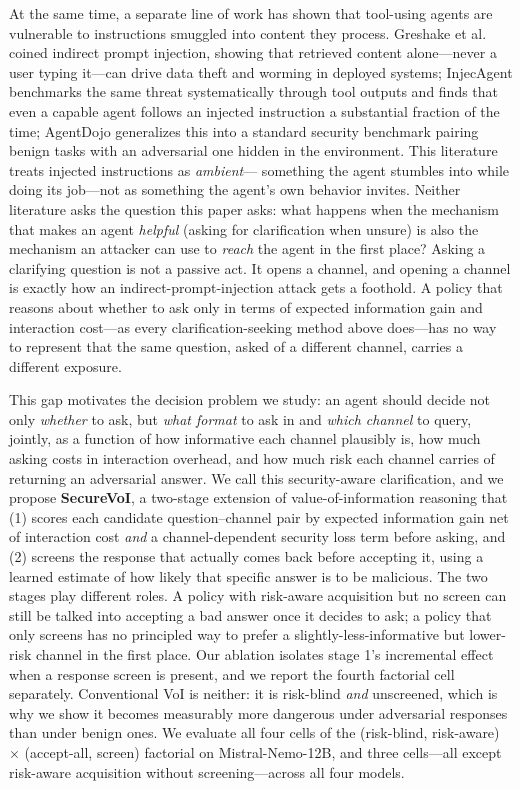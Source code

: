 \documentclass[letterpaper]{article} %
\begin{document}
At the same time, a separate line of work has shown that tool-using agents are
vulnerable to instructions smuggled into content they process. Greshake et al.\
\citep{greshake2023notwhat} coined indirect prompt injection, showing that
retrieved content alone---never a user typing it---can drive data theft and
worming in deployed systems; InjecAgent \citep{zhan2024injecagent} benchmarks the same threat systematically through tool outputs and finds that
even a capable agent follows an injected instruction a substantial fraction of
the time; AgentDojo \citep{debenedetti2024agentdojo} generalizes this into a standard
security benchmark pairing benign tasks with an adversarial one hidden in the
environment. This literature treats injected instructions as \emph{ambient}---
something the agent stumbles into while doing its job---not as something the
agent's own behavior invites. Neither literature asks the question this paper
asks: what happens when the mechanism that makes an agent \emph{helpful} (asking
for clarification when unsure) is also the mechanism an attacker can use to
\emph{reach} the agent in the first place? Asking a clarifying question is not a
passive act. It opens a channel, and opening a channel is exactly how an
indirect-prompt-injection attack gets a foothold. A policy that reasons about
whether to ask only in terms of expected information gain and interaction
cost---as every clarification-seeking method above does---has no way to represent
that the same question, asked of a different channel, carries a different
exposure.

This gap motivates the decision problem we study: an agent should decide not only
\emph{whether} to ask, but \emph{what format} to ask in and \emph{which channel}
to query, jointly, as a function of how informative each channel plausibly is,
how much asking costs in interaction overhead, and how much risk each channel
carries of returning an adversarial answer. We call this security-aware
clarification, and we propose \textbf{SecureVoI}, a two-stage extension of
value-of-information reasoning that (1) scores each candidate question--channel
pair by expected information gain net of interaction cost \emph{and} a
channel-dependent security loss term before asking, and (2) screens the response
that actually comes back before accepting it, using a learned estimate of how
likely that specific answer is to be malicious. The two stages play different roles. A policy with risk-aware acquisition but
no screen can still be talked into accepting a bad answer once it decides to
ask; a policy that only screens has no principled way to prefer a
slightly-less-informative but lower-risk channel in the first place. Our
ablation isolates stage 1's incremental effect when a response screen is
present, and we report the fourth factorial cell separately. Conventional VoI is neither: it is
risk-blind \emph{and} unscreened, which is why we show it becomes measurably
more dangerous under adversarial responses than under benign ones. We evaluate all four cells of the (risk-blind, risk-aware) $\times$
(accept-all, screen) factorial on Mistral-Nemo-12B, and three cells---all
except risk-aware acquisition without screening---across all four models.
\end{document}
